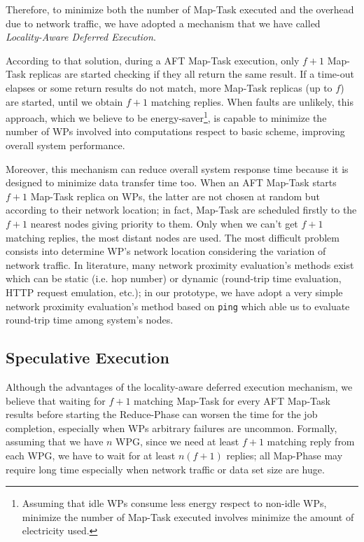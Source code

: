 \documentclass[sigchi]{acmart}
\begin{document}
Therefore, to minimize both the number of Map-Task executed and the overhead due to network traffic, we have adopted a mechanism that we have called \textit{Locality-Aware Deferred Execution}. 

According to that solution, during a AFT Map-Task execution, only $f + 1$ Map-Task replicas are started checking if they all return the same result. If a time-out elapses or some return results do not match, more Map-Task replicas (up to $f$) are started, until we obtain $f + 1$ matching replies. When faults are unlikely, this approach, which we believe to be energy-saver\footnote{Assuming that idle WPs consume less energy respect to non-idle WPs, minimize the number of Map-Task executed involves minimize the amount of electricity used.}, is capable to minimize the number of WPs involved into computations respect to basic scheme, improving overall system performance.

Moreover, this mechanism can reduce overall system response time because it is designed to minimize data transfer time too. When an AFT Map-Task starts $f + 1$ Map-Task replica on WPs, the latter are not chosen at random but according to their network location; in fact, Map-Task are scheduled firstly to the $f + 1$ nearest nodes giving priority to them. Only when we can't get $f + 1$ matching replies, the most distant nodes are used. The most difficult problem consists into determine WP's network location considering the variation of network traffic. In literature, many network proximity evaluation's methods exist which can be static (i.e. hop number) or dynamic (round-trip time evaluation, HTTP request emulation, etc.); in our prototype, we have adopt a very simple network proximity evaluation's method based on \texttt{ping} which able us to evaluate round-trip time among system's nodes. 

\subsection{Speculative Execution}

Although the advantages of the locality-aware deferred execution mechanism, we believe that waiting for $f + 1$ matching Map-Task for every AFT Map-Task results before starting the Reduce-Phase can worsen the time for the job completion, especially when WPs arbitrary failures are uncommon. Formally, assuming that we have $n$ WPG, since we need at least $f + 1$ matching reply from each WPG, we have to wait for at least $n(f + 1)$ replies; all Map-Phase may require long time especially when network traffic or data set size are huge.
\end{document}
